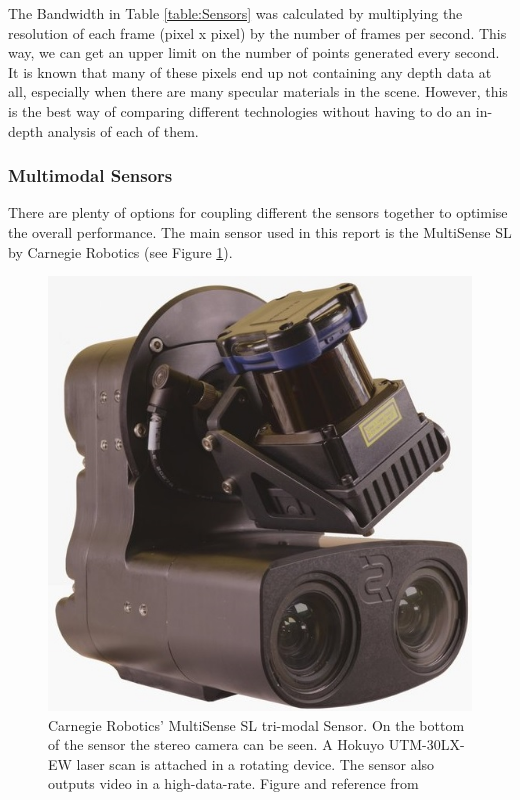 \documentclass[11pt]{article}
\begin{document}
The Bandwidth in Table \ref{table:Sensors} was calculated by multiplying the resolution of each frame (pixel x pixel) by the number of frames per second. This way, we can get an upper limit on the number of points generated every second. It is known that many of these pixels end up not containing any depth data at all, especially when there are many specular materials in the scene. However, this is the best way of comparing different technologies without having to do an in-depth analysis of each of them.

	\subsubsection{Multimodal Sensors}
	
There are plenty of options for coupling different the sensors together to optimise the overall performance. The main sensor used in this report is the MultiSense SL by Carnegie Robotics \cite{multisense} (see Figure \ref{fig:MultiSenseSLSensor}).

\begin{figure}
	\begin{minipage}{0.45\textwidth}
		\centering
		\includegraphics[width=\textwidth]{MultiSenseSL}
	\end{minipage} \hfill
	\begin{minipage}{0.55\textwidth}
		\centering
		\caption{Carnegie Robotics' MultiSense SL tri-modal Sensor. On the bottom of the sensor the stereo camera can be seen. A Hokuyo UTM-30LX-EW laser scan is attached in a rotating device. The sensor also outputs video in a high-data-rate. Figure and reference from \cite{MultiSenseSLSensor}}
		\label{fig:MultiSenseSLSensor}
	\end{minipage}				
\end{figure}
\end{document}
